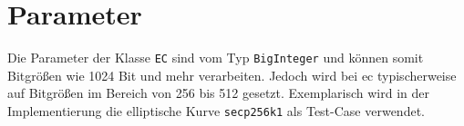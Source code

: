 \section{Parameter}
Die Parameter der Klasse \texttt{EC} sind vom Typ \texttt{BigInteger} und können somit Bitgrößen wie 1024 Bit und mehr verarbeiten. Jedoch wird bei \gls{ec} typischerweise auf Bitgrößen im Bereich von 256 bis 512 gesetzt. Exemplarisch wird in der Implementierung die elliptische Kurve \texttt{secp256k1} als Test-Case verwendet.

